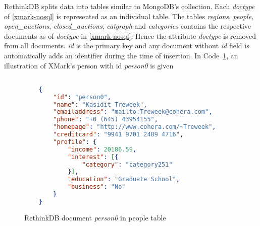 RethinkDB splits data into tables similar to MongoDB's collection.  Each \textit{doctype} of \ref{xmark-nosql} is represented as an individual table. The tables \textit{regions}, \textit{people}, \textit{open\_auctions}, \textit{closed\_auctions}, \textit{catgraph} and \textit{categories} contains the respective documents as of \textit{doctype} in \ref{xmark-nosql}. Hence the attribute \textit{doctype} is removed from all documents.  \textit{id} is the primary key and any document without \textit{id} field is automatically adds an identifier during the time of insertion. In Code~\ref{code:rethindb-person0}, an illustration of XMark's person with id \textit{person0} is given
\begin{figure}
\centering
\begin{lstlisting}[language=JSON,basicstyle =\scriptsize]

	{
		"id": "person0",
		"name": "Kasidit Treweek",
		"emailaddress": "mailto:Treweek@cohera.com",
		"phone": "+0 (645) 43954155",
		"homepage": "http://www.cohera.com/~Treweek",
		"creditcard": "9941 9701 2489 4716",
		"profile": {
			"income": 20186.59,
			"interest": [{
				"category": "category251"
			}],
			"education": "Graduate School",
			"business": "No"
		}
	}
\end{lstlisting}
\caption{RethinkDB document \textit{person0} in people table}
\label{code:rethindb-person0}
\end{figure}
	
